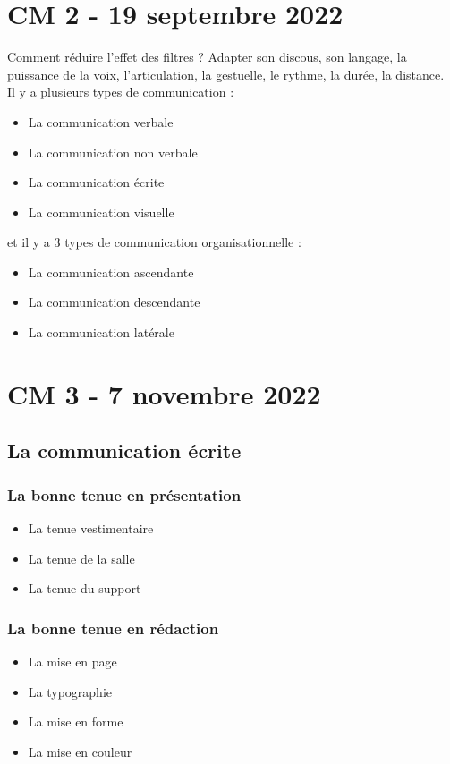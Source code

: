 \documentclass[12pt, a4paper]{article}
\begin{document}
\section{CM 2 - 19 septembre 2022}
Comment réduire l'effet des filtres ? Adapter son discous, son langage, la puissance
de la voix, l'articulation, la gestuelle, le rythme, la durée, la distance. \\

Il y a plusieurs types de communication :
\begin{itemize}
	\item La communication verbale
	\item La communication non verbale
	\item La communication écrite
	\item La communication visuelle\\
\end{itemize}

et il y a 3 types de communication organisationnelle :
\begin{itemize}
	\item La communication ascendante
	\item La communication descendante
	\item La communication latérale
\end{itemize}

\newpage

\section{CM 3 - 7 novembre 2022}
\subsection{La communication écrite}
\subsubsection{La bonne tenue en présentation}
\begin{itemize}
	\item La tenue vestimentaire
	\item La tenue de la salle
	\item La tenue du support
\end{itemize}

\subsubsection{La bonne tenue en rédaction}
\begin{itemize}
	\item La mise en page
	\item La typographie
	\item La mise en forme
	\item La mise en couleur
\end{itemize}
\end{document}
